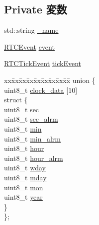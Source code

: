 \subsection*{Private 変数}
\begin{DoxyCompactItemize}
\item 
std::string \hyperlink{classMC146818_aaf2ed934b37cbbd236fdd1b01a5f5005}{\_\-name}
\item 
\hyperlink{structMC146818_1_1RTCEvent}{RTCEvent} \hyperlink{classMC146818_adb3e426cd9214d797472cddc46fd8b0a}{event}
\item 
\hyperlink{structMC146818_1_1RTCTickEvent}{RTCTickEvent} \hyperlink{classMC146818_afa706dc4758601c480227eead115ccfb}{tickEvent}
\item 
\begin{tabbing}
xx\=xx\=xx\=xx\=xx\=xx\=xx\=xx\=xx\=\kill
union \{\\
\>uint8\_t \hyperlink{classMC146818_a574a6ffc3b886b66eb7f05f4a4abc0d4}{clock\_data} \mbox{[}10\mbox{]}\\
\>struct \{\\
\>\>uint8\_t \hyperlink{classMC146818_ad1696900026b287a87c563b733a21bc3}{sec}\\
\>\>uint8\_t \hyperlink{classMC146818_a1d76d44501cb4a6ae50d2e4be0e81932}{sec\_alrm}\\
\>\>uint8\_t \hyperlink{classMC146818_ac9b481208b43f7c37ed25e446bdec692}{min}\\
\>\>uint8\_t \hyperlink{classMC146818_a59555221d86f00c30bda63b8458fd6b4}{min\_alrm}\\
\>\>uint8\_t \hyperlink{classMC146818_ae5af4ff48939d13d480f87e56a9385d6}{hour}\\
\>\>uint8\_t \hyperlink{classMC146818_a41c0d56541d0b0e66f915931f047e18d}{hour\_alrm}\\
\>\>uint8\_t \hyperlink{classMC146818_acf7d2d98117c452b351c130883b70eba}{wday}\\
\>\>uint8\_t \hyperlink{classMC146818_a8f4f1d1a3991d8405faca08fd1c3ea9b}{mday}\\
\>\>uint8\_t \hyperlink{classMC146818_ac994d1b867aab54062cdd1ee94510030}{mon}\\
\>\>uint8\_t \hyperlink{classMC146818_a7af2065789bc84419b8d5fe109be83b5}{year}\\
\>\} \\
\}; \\


\end{tabbing}
\end{DoxyCompactItemize}
